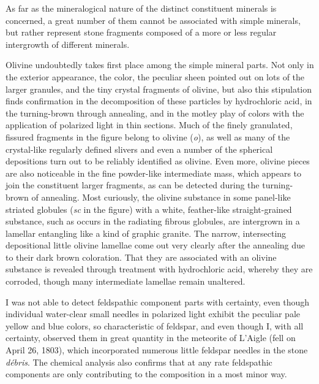 \documentclass[a4paper, 12pt, oneside]{article}
\begin{document}
As far as the mineralogical nature of the distinct constituent minerals is concerned, a great number of them cannot be associated with simple minerals, but rather represent stone fragments composed of a more or less regular intergrowth of different minerals.

Olivine undoubtedly takes first place among the simple mineral parts. Not only in the exterior appearance, the color, the peculiar sheen pointed out on lots of the larger granules, and the tiny crystal fragments of olivine, but also this stipulation finds confirmation in the decomposition of these particles by hydrochloric acid, in the turning-brown through annealing, and in the motley play of colors with the application of polarized light in thin sections. Much of the finely granulated, fissured fragments in the figure belong to olivine (\emph{o}), as well as many of the crystal-like regularly defined slivers and even a number of the spherical depositions turn out to be reliably identified as olivine. Even more, olivine pieces are also noticeable in the fine powder-like intermediate mass, which appears to join the constituent larger fragments, as can be detected during the turning-brown of annealing. Most curiously, the olivine substance in some panel-like striated globules (\emph{sc} in the figure) with a white, feather-like straight-grained substance, such as occurs in the radiating fibrous globules, are intergrown in a lamellar entangling like a kind of graphic granite. The narrow, intersecting depositional little olivine lamellae come out very clearly after the annealing due to their dark brown coloration. That they are associated with an olivine substance is revealed through treatment with hydrochloric acid, whereby they are corroded, though many intermediate lamellae remain unaltered.

I was not able to detect feldspathic component parts with certainty, even though individual water-clear small needles in polarized light exhibit the peculiar pale yellow and blue colors, so characteristic of feldspar, and even though I, with all certainty, observed them in great quantity in the meteorite of L'Aigle (fell on April 26, 1803), which incorporated numerous little feldspar needles in the stone \emph{débris}. The chemical analysis also confirms that at any rate feldspathic components are only contributing to the composition in a most minor way.
\end{document}
